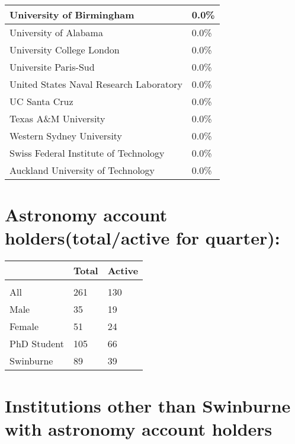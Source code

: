 \documentclass{article}%
\begin{document}
\begin{longtabu}{X[l] X[r]}
\hline%
University of Birmingham&0.0\%\\%
\hline%
University of Alabama&0.0\%\\%
\hline%
University College London&0.0\%\\%
\hline%
Universite Paris{-}Sud&0.0\%\\%
\hline%
United States Naval Research Laboratory&0.0\%\\%
\hline%
UC Santa Cruz&0.0\%\\%
\hline%
Texas A\&M University&0.0\%\\%
\hline%
Western Sydney University&0.0\%\\%
\hline%
Swiss Federal Institute of Technology&0.0\%\\%
\hline%
Auckland University of Technology&0.0\%\\%
\hline%
\end{longtabu}%
\section{Astronomy account holders(total/active for quarter): }%

%
\begin{longtabu}{X[l] X[r] X[r]}%
\textbf{}&\textbf{Total}&\textbf{Active}\\%
\hline%
&&\\%
All&261&130\\%
\hline%
Male&35&19\\%
\hline%
Female&51&24\\%
\hline%
PhD Student&105&66\\%
\hline%
Swinburne&89&39\\%
\hline%
\end{longtabu}%
\section{Institutions other than Swinburne with astronomy account holders}%
\end{document}
